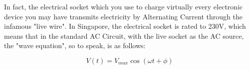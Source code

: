 \documentclass[a4paper,12pt,oneside]{book}
\begin{document}
In fact, the electrical socket which you use to charge virtually every electronic device you may have transmits electricity by Alternating Current through the infamous "live wire". In Singapore, the electrical socket is rated to 230V, which means that in the standard AC Circuit, with the live socket as the AC source, the "wave equation", so to speak, is as follows:

\[ V(t) = V_{max} \cos(\omega t + \phi) \]




% 
% 
\end{document}
